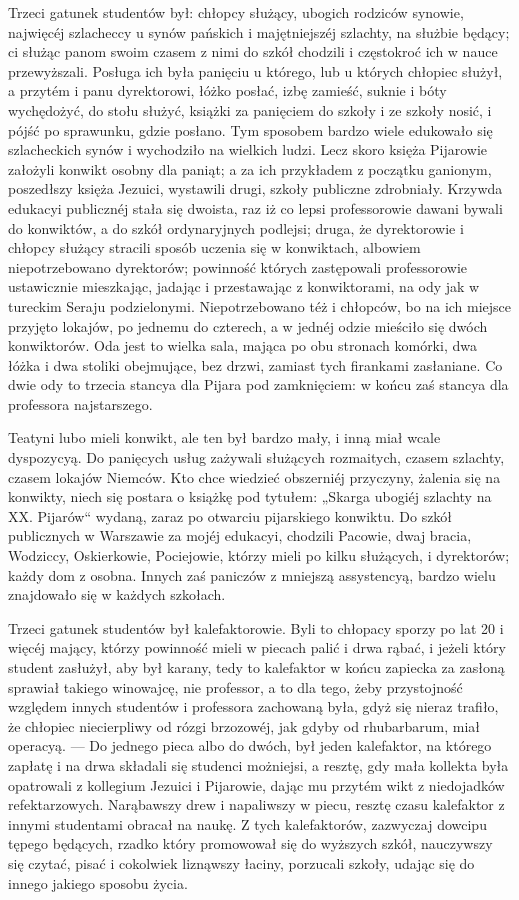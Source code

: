 \documentclass{book}
\begin{document}
Trzeci gatunek studentów był: chłopcy służący, ubogich rodziców synowie, najwięcéj szlacheccy u synów pańskich i majętniejszéj szlachty, na służbie będący; ci służąc panom swoim czasem z nimi do szkół chodzili i częstokroć ich w nauce przewyższali. Posługa ich była panięciu u którego, lub u których chłopiec służył, a przytém i panu dyrektorowi, łóżko posłać, izbę zamieść, suknie i bóty wychędożyć, do stołu służyć, książki za panięciem do szkoły i ze szkoły nosić, i pójść po sprawunku, gdzie posłano. Tym sposobem bardzo wiele edukowało się szlacheckich synów i wychodziło na wielkich ludzi. Lecz skoro księża Pijarowie założyli konwikt osobny dla paniąt; a za ich przykładem z początku ganionym, poszedłszy księża Jezuici, wystawili drugi, szkoły publiczne zdrobniały. Krzywda edukacyi publicznéj stała się dwoista, raz iż co lepsi professorowie dawani bywali do konwiktów, a do szkół ordynaryjnych podlejsi; druga, że dyrektorowie i chłopcy służący stracili sposób uczenia się w konwiktach, albowiem niepotrzebowano dyrektorów; powinność których zastępowali professorowie ustawicznie mieszkając, jadając i przestawając z konwiktorami, na ody jak w tureckim Seraju podzielonymi. Niepotrzebowano téż i chłopców, bo na ich miejsce przyjęto lokajów, po jednemu do czterech, a w jednéj odzie mieściło się dwóch konwiktorów. Oda jest to wielka sala, mająca po obu stronach komórki, dwa łóżka i dwa stoliki obejmujące, bez drzwi, zamiast tych firankami zasłaniane. Co dwie ody to trzecia stancya dla Pijara pod zamknięciem: w końcu zaś stancya dla professora najstarszego.

Teatyni lubo mieli konwikt, ale ten był bardzo mały, i inną miał wcale dyspozycyą. Do panięcych usług zażywali służących rozmaitych, czasem szlachty, czasem lokajów Niemców. Kto chce wiedzieć obszerniéj przyczyny, żalenia się na konwikty, niech się postara o książkę pod tytułem: „Skarga ubogiéj szlachty na XX. Pijarów“ wydaną, zaraz po otwarciu pijarskiego konwiktu. Do szkół publicznych w Warszawie za mojéj edukacyi, chodzili Pacowie, dwaj bracia, Wodziccy, Oskierkowie, Pociejowie, którzy mieli po kilku służących, i dyrektorów; każdy dom z osobna. Innych zaś paniczów z mniejszą assystencyą, bardzo wielu znajdowało się w każdych szkołach.

Trzeci gatunek studentów był kalefaktorowie. Byli to chłopacy sporzy po lat 20 i więcéj mający, którzy powinność mieli w piecach palić i drwa rąbać, i jeżeli który student zasłużył, aby był karany, tedy to kalefaktor w końcu zapiecka za zasłoną sprawiał takiego winowajcę, nie professor, a to dla tego, żeby przystojność względem innych studentów i professora zachowaną była, gdyż się nieraz trafiło, że chłopiec niecierpliwy od rózgi brzozowéj, jak gdyby od rhubarbarum, miał operacyą. — Do jednego pieca albo do dwóch, był jeden kalefaktor, na którego zapłatę i na drwa składali się studenci możniejsi, a resztę, gdy mała kollekta była opatrowali z kollegium Jezuici i Pijarowie, dając mu przytém wikt z niedojadków refektarzowych. Narąbawszy drew i napaliwszy w piecu, resztę czasu kalefaktor z innymi studentami obracał na naukę. Z tych kalefaktorów, zazwyczaj dowcipu tępego będących, rzadko który promowował się do wyższych szkół, nauczywszy się czytać, pisać i cokolwiek liznąwszy łaciny, porzucali szkoły, udając się do innego jakiego sposobu życia.
\end{document}

